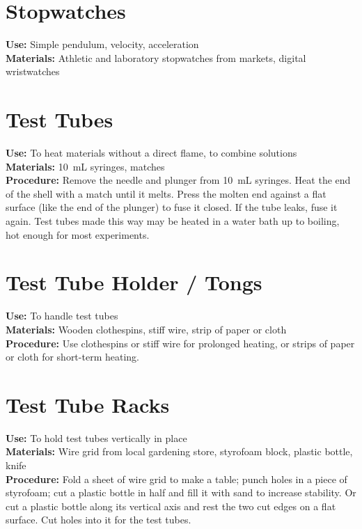 \section*{Stopwatches}
\vspace{-10pt}
\textbf{Use:} Simple pendulum, velocity, acceleration\\
\textbf{Materials:} Athletic and laboratory stopwatches from markets, digital wristwatches

\section*{Test Tubes}
\label{sec:testtubes}
\vspace{-10pt}
\textbf{Use:} To heat materials without a direct flame, to combine solutions\\
\textbf{Materials:} 10~mL syringes, matches\\
\textbf{Procedure:} Remove the needle and plunger from 10~mL syringes. Heat the end of the shell with a match until it melts. Press the molten end against a flat surface (like the end of the plunger) to fuse it closed. If the tube leaks, fuse it again. Test tubes made this way may be heated in a water bath up to boiling, hot enough for most experiments.

\section*{Test Tube Holder / Tongs}
\vspace{-10pt}
\textbf{Use:} To handle test tubes\\
\textbf{Materials:} Wooden clothespins, stiff wire, strip of paper or cloth\\
\textbf{Procedure:} Use clothespins or stiff wire for prolonged heating, or strips of paper or cloth for short-term heating.

\section*{Test Tube Racks}
\vspace{-10pt}
\textbf{Use:} To hold test tubes vertically in place\\
\textbf{Materials:} Wire grid from local gardening store, styrofoam block, plastic bottle, knife\\
\textbf{Procedure:} Fold a sheet of wire grid to make a table; punch holes in a piece of styrofoam; cut a plastic bottle in half and fill it with sand to increase stability. Or cut a plastic bottle along its vertical axis and rest the two cut edges on a flat surface. Cut holes into it for the test tubes.

